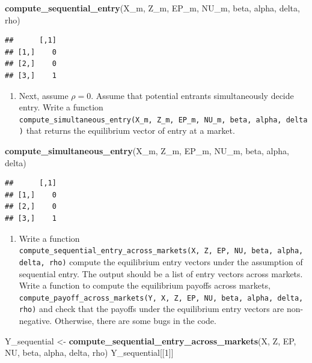 \documentclass[]{book}
\newenvironment{Shaded}{\begin{snugshade}}{\end{snugshade}}
\newcommand{\KeywordTok}[1]{\textcolor[rgb]{0.13,0.29,0.53}{\textbf{#1}}}
\newcommand{\DecValTok}[1]{\textcolor[rgb]{0.00,0.00,0.81}{#1}}
\newcommand{\StringTok}[1]{\textcolor[rgb]{0.31,0.60,0.02}{#1}}
\newcommand{\NormalTok}[1]{#1}
\providecommand{\tightlist}{%
  \setlength{\itemsep}{0pt}\setlength{\parskip}{0pt}}
\begin{document}
\begin{Shaded}
\begin{Highlighting}[]
\KeywordTok{compute_sequential_entry}\NormalTok{(X_m, Z_m, EP_m, NU_m, beta, alpha, delta, rho)}
\end{Highlighting}
\end{Shaded}

\begin{verbatim}
##      [,1]
## [1,]    0
## [2,]    0
## [3,]    1
\end{verbatim}

\begin{enumerate}
\def\labelenumi{\arabic{enumi}.}
\setcounter{enumi}{5}
\tightlist
\item
  Next, assume \(\rho = 0\). Assume that potential entrants
  simultaneously decide entry. Write a function
  \texttt{compute\_simultaneous\_entry(X\_m,\ Z\_m,\ EP\_m,\ NU\_m,\ beta,\ alpha,\ delta)}
  that returns the equilibrium vector of entry at a market.
\end{enumerate}

\begin{Shaded}
\begin{Highlighting}[]
\KeywordTok{compute_simultaneous_entry}\NormalTok{(X_m, Z_m, EP_m, NU_m, beta, alpha, delta)}
\end{Highlighting}
\end{Shaded}

\begin{verbatim}
##      [,1]
## [1,]    0
## [2,]    0
## [3,]    1
\end{verbatim}

\begin{enumerate}
\def\labelenumi{\arabic{enumi}.}
\setcounter{enumi}{6}
\tightlist
\item
  Write a function
  \texttt{compute\_sequential\_entry\_across\_markets(X,\ Z,\ EP,\ NU,\ beta,\ alpha,\ delta,\ rho)}
  compute the equilibrium entry vectors under the assumption of
  sequential entry. The output should be a list of entry vectors across
  markets. Write a function to compute the equilibrium payoffs across
  markets,
  \texttt{compute\_payoff\_across\_markets(Y,\ X,\ Z,\ EP,\ NU,\ beta,\ alpha,\ delta,\ rho)}
  and check that the payoffs under the equilibrium entry vectors are
  non-negative. Otherwise, there are some bugs in the code.
\end{enumerate}

\begin{Shaded}
\begin{Highlighting}[]
\NormalTok{Y_sequential <-}
\StringTok{  }\KeywordTok{compute_sequential_entry_across_markets}\NormalTok{(X, Z, EP, NU, beta, alpha, delta, rho)}
\NormalTok{Y_sequential[[}\DecValTok{1}\NormalTok{]]}
\end{Highlighting}
\end{Shaded}
\end{document}

